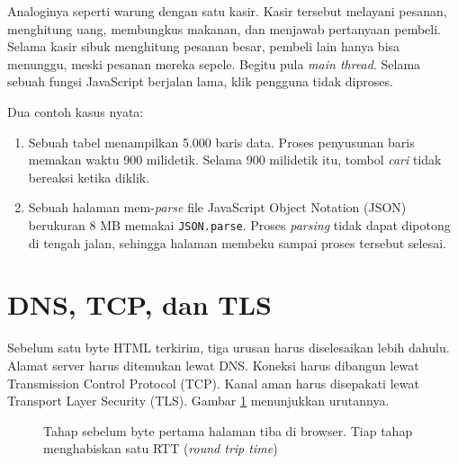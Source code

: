 Analoginya seperti warung dengan satu kasir. Kasir tersebut melayani pesanan,
menghitung uang, membungkus makanan, dan menjawab pertanyaan pembeli. Selama
kasir sibuk menghitung pesanan besar, pembeli lain hanya bisa menunggu, meski
pesanan mereka sepele. Begitu pula \textit{main thread}. Selama sebuah fungsi
JavaScript berjalan lama, klik pengguna tidak diproses.

Dua contoh kasus nyata:

\begin{enumerate}
  \item Sebuah tabel menampilkan 5.000 baris data. Proses penyusunan baris
        memakan waktu 900 milidetik. Selama 900 milidetik itu, tombol
        \emph{cari} tidak bereaksi ketika diklik.
  \item Sebuah halaman mem-\textit{parse} file JavaScript Object Notation
        (JSON) berukuran 8 MB memakai \texttt{JSON.parse}. Proses
        \textit{parsing} tidak dapat dipotong di tengah jalan, sehingga halaman
        membeku sampai proses tersebut selesai.
\end{enumerate}

\section{DNS, TCP, dan TLS}

Sebelum satu byte HTML terkirim, tiga urusan harus diselesaikan lebih dahulu.
Alamat server harus ditemukan lewat DNS. Koneksi harus dibangun lewat
Transmission Control Protocol (TCP). Kanal aman harus disepakati lewat
Transport Layer Security (TLS). Gambar \ref{fig:koneksi} menunjukkan urutannya.

\begin{figure}[ht]
  \centering
  \caption{Tahap sebelum byte pertama halaman tiba di browser. Tiap tahap
           menghabiskan satu RTT (\textit{round trip time})}
  \label{fig:koneksi}
\end{figure}

